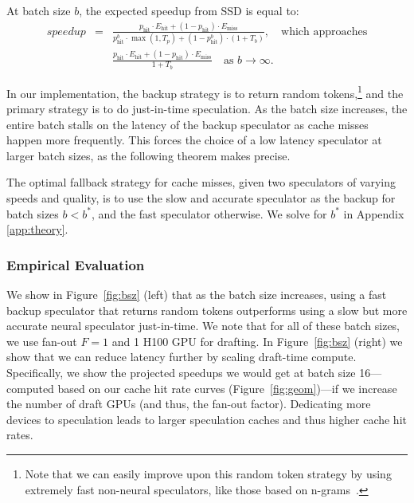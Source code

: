 \begin{corollary}
\label{cor:speedup_with_batch_size}
At batch size $b$, the expected speedup from SSD is equal to:
\begin{eqnarray*}
speedup &=& \frac{p_{\mathrm{hit}} \cdot E_{\mathrm{hit}} + (1-p_{\mathrm{hit}}) \cdot E_{\mathrm{miss}}}{p_{\mathrm{hit}}^b \cdot \max(1, T_p) + (1-p_{\mathrm{hit}}^b) \cdot (1 + T_b)}, \quad \text{which approaches} \\
    && \frac{p_{\mathrm{hit}} \cdot E_{\mathrm{hit}} + (1-p_{\mathrm{hit}}) \cdot E_{\mathrm{miss}}}{1 + T_b} \quad \text{as } b \rightarrow \infty.
\end{eqnarray*}
\end{corollary}
In our implementation, the backup strategy is to return random tokens,\footnote{Note that we can easily improve upon this random token strategy by using extremely fast non-neural speculators, like those based on n-grams~\citep{infinigram,suffixtree}.} and the primary strategy is to do just-in-time speculation. 
As the batch size increases, the entire batch stalls on the latency of the backup speculator as cache misses happen more frequently.
This forces the choice of a low latency speculator at larger batch sizes, as the following theorem makes precise. 
\color{black}

\begin{theorem}
\label{thm:cache_miss}
The optimal fallback strategy for cache misses, given two speculators of varying speeds and quality, is to use the slow and accurate speculator as the backup for batch sizes $b < b^*$, and the fast speculator otherwise.
We solve for $b^*$ in Appendix \ref{app:theory}. 
\end{theorem}


\subsubsection{Empirical Evaluation}
We show in Figure~\ref{fig:bsz} (left) that as the batch size increases, using a fast backup speculator that returns random tokens outperforms using a slow but more accurate neural speculator just-in-time.
We note that for all of these batch sizes, we use fan-out $F=1$ and 1 H100 GPU for drafting.
In Figure~\ref{fig:bsz} (right) we show that we can reduce latency further by scaling draft-time compute.
Specifically, we show the projected speedups we would get at batch size 16---computed based on our cache hit rate curves (Figure~\ref{fig:geom})---if we increase the number of draft GPUs (and thus, the fan-out factor).
Dedicating more devices to speculation leads to larger speculation caches and thus higher cache hit rates. 

